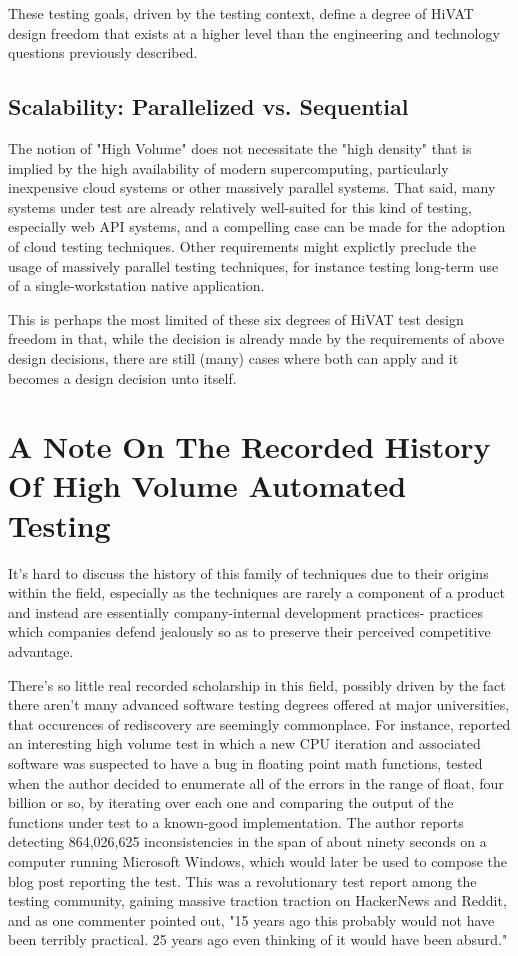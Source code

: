 These testing goals, driven by the testing context, define a degree of HiVAT design freedom that exists at a higher level than the engineering and technology questions previously described.

\subsection{Scalability: Parallelized vs. Sequential}
The notion of "High Volume" does not necessitate the "high density" that is implied by the high availability of modern supercomputing, particularly inexpensive cloud systems or other massively parallel systems. That said, many systems under test are already relatively well-suited for this kind of testing, especially web API systems, and a compelling case can be made for the adoption of cloud testing techniques.\citep{parveen2010migrate} Other requirements might explictly preclude the usage of massively parallel testing techniques, for instance testing long-term use of a single-workstation native application.

This is perhaps the most limited of these six degrees of HiVAT test design freedom in that, while the decision is already made by the requirements of above design decisions, there are still (many) cases where both can apply and it becomes a design decision unto itself.

\section{A Note On The Recorded History Of High Volume Automated Testing}
It's hard to discuss the history of this family of techniques due to their origins within the field, especially as the techniques are rarely a component of a product and instead are essentially company-internal development practices- practices which companies defend jealously so as to preserve their perceived competitive advantage.

There's so little real recorded scholarship in this field, possibly driven by the fact there aren't many advanced software testing degrees offered at major universities, that occurences of rediscovery are seemingly commonplace. For instance, \citet{dawsonFourBillion} reported an interesting high volume test in which a new CPU iteration and associated software was suspected to have a bug in floating point math functions, tested when the author decided to enumerate all of the errors in the range of float, four billion or so, by iterating over each one and comparing the output of the functions under test to a known-good implementation. The author reports detecting 864,026,625 inconsistencies in the span of about ninety seconds on a computer running Microsoft Windows, which would later be used to compose the blog post reporting the test. This was a revolutionary test report among the testing community, gaining massive traction traction on HackerNews and Reddit, and as one commenter pointed out, "15 years ago this probably would not have been terribly practical. 25 years ago even thinking of it would have been absurd."

